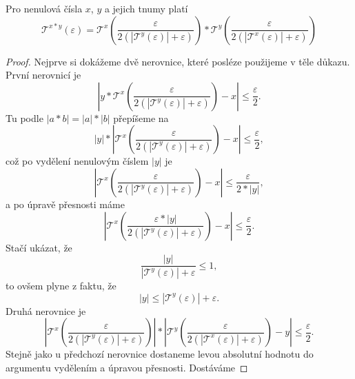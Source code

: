 \begin{theorem}\label{vet:soucin_dvou_tnumu}
Pro nenulová čísla $x$, $y$ a jejich tnumy platí
\begin{equation}
\mathcal{T}^{x*y}(\varepsilon)=\mathcal{T}^x\left(\frac{\varepsilon}{2(|\mathcal{T}^y(\varepsilon)| + \varepsilon)}\right)*\mathcal{T}^y\left(\frac{\varepsilon}{2(|\mathcal{T}^x(\varepsilon)| + \varepsilon)}\right)
\end{equation}
\begin{proof}
Nejprve si dokážeme dvě nerovnice, které posléze použijeme v těle důkazu.
První nerovnicí je 
\begin{equation}\label{duk:soucin_prvni}
\left|y * \mathcal{T}^x\left(\frac{\varepsilon}{2(|\mathcal{T}^y(\varepsilon)|+\varepsilon)}\right)-x\right|\leq\frac{\varepsilon}{2}.
\end{equation}
Tu podle $|a*b|=|a|*|b|$ přepíšeme na
\begin{equation}
|y|*\left|\mathcal{T}^x\left(\frac{\varepsilon}{2(|\mathcal{T}^y(\varepsilon)|+\varepsilon)}\right)-x\right|\leq\frac{\varepsilon}{2},
\end{equation}
což po vydělení nenulovým číslem $|y|$ je
\begin{equation}
\left|\mathcal{T}^x\left(\frac{\varepsilon}{2(|\mathcal{T}^y(\varepsilon)|+\varepsilon)}\right)-x\right|\leq\frac{\varepsilon}{2*|y|},
\end{equation}
a po úpravě přesnosti máme
\begin{equation}
\left|\mathcal{T}^x\left(\frac{\varepsilon*|y|}{2(|\mathcal{T}^y(\varepsilon)|+\varepsilon)}\right)-x\right|\leq\frac{\varepsilon}{2}.
\end{equation}
Stačí ukázat, že
\begin{equation}
\frac{|y|}{|\mathcal{T}^y(\varepsilon)|+\varepsilon}\leq 1,
\end{equation}
to ovšem plyne z faktu, že
\begin{equation}
|y|\leq |\mathcal{T}^y(\varepsilon)|+\varepsilon.
\end{equation}
Druhá nerovnice je
\begin{equation}\label{duk:soucin_druha}
\left|\mathcal{T}^x\left(\frac{\varepsilon}{2(|\mathcal{T}^y(\varepsilon)|+\varepsilon)}\right)\right| *\left|\mathcal{T}^y\left(\frac{\varepsilon}{2(|\mathcal{T}^x(\varepsilon)|+\varepsilon)}\right)-y\right|\leq\frac{\varepsilon}{2}.
\end{equation}
Stejně jako u předchozí nerovnice dostaneme levou absolutní hodnotu do argumentu vydělením a úpravou přesnosti. Dostáváme

\end{proof}
\end{theorem}
